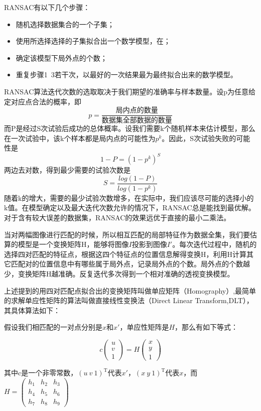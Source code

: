 RANSAC有以下几个步骤：
\begin{itemize}
\item 随机选择数据集合的一个子集；
\item 使用所选择选择的子集拟合出一个数学模型，在；
\item 确定该模型下局外点的个数；
\item 重复步骤1~3若干次，以最好的一次结果最为最终拟合出来的数学模型。
\end{itemize}

RANSAC算法迭代次数的选取取决于我们期望的准确率与样本数量。设p为任意给定对应点合法的概率，即
\[p = \frac{\text{局内点的数量}}{\text{数据集全部数据的数量}}\]
而P是经过S次试验后成功的总体概率。设我们需要k个随机样本来估计模型，那么在一次试验中，该k个样本都是局内点的可能性为\(p^k\)。因此，S次试验失败的可能性是
\[1 - P = (1 - p^k)^S\]
两边去对数，得到最少需要的试验次数是
\[S = \frac{log(1-P)}{log(1-p^k)}\]
随着k的增大，需要的最少试验次数增多，在实际中，我们应该尽可能的选择小的k值。在模型确定以及最大迭代次数允许的情况下，RANSAC总是能找到最优解。对于含有较大误差的数据集，RANSAC的效果远优于直接的最小二乘法。 

当对两幅图像进行匹配的时候，所以相互匹配的局部特征作为数据全集，我们要估算的模型是一个变换矩阵H，能够将图像\(I\)投影到图像\(I'\)。每次迭代过程中，随机的选择四对匹配的特征点，根据这四个特征点的位置信息解得变换H，利用H计算其它匹配对的位置信息中有哪些属于局外点，记录局外点的个数。局外点的个数越少，变换矩阵H越准确。反复迭代多次得到一个相对准确的透视变换模型。

上述提到的用四对匹配点拟合出的变换矩阵叫做单应矩阵（Homography）,最简单的求解单应性矩阵的算法叫做直接线性变换法（Direct Linear Transform,DLT）\cite{Dubrofsky:2009tz}，其具体算法如下：

假设我们相匹配的一对点分别是\(x\)和\(x'\)，单应性矩阵是\(H\)，那么有如下等式：

\begin{equation}
\label{homography1}
	c
	\begin{pmatrix}
	u \\
	v \\
	1
	\end{pmatrix}
	= H
	\begin{pmatrix}
	x \\
	y \\
	1
	\end{pmatrix}
\end{equation}


其中c是一个非零常数，\((u\ v\ 1)^\mathrm{T}\)代表\(x'\)，\((x \ y \ 1)^\mathrm{T}\)代表\(x\)，而
\(
H = 
\begin{pmatrix}
h_1 & h_2 & h_3 \\
h_4 & h_5 & h_6 \\
h_7 & h_8 & h_9
\end{pmatrix}
\)

